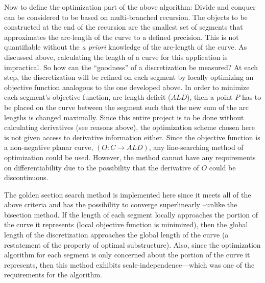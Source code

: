 Now to define the optimization part of the above algorithm:  Divide and 
conquer can be considered to be based on multi-branched recursion.  The 
objects to be constructed at the end of the recursion are the smallest set 
of segments that approximates the arc-length of the curve to a defined 
precision.  This is not quantifiable without the {\it{a priori}} knowledge 
of the arc-length of the curve.  As discussed above, calculating the 
length of a curve for this application is impractical.  So how can the 
``goodness'' of a discretization be measured?  At each step, the 
discretization will be refined on each segment by locally optimizing an 
objective function analogous to the one developed above.  In order to 
minimize each segment’s objective function, arc length deficit ($ALD$), 
then a point $P$ has to be placed on the curve between the segment such 
that the new sum of the arc lengths is changed maximally.  Since this 
entire project is to be done without calculating derivatives (see reasons 
above), the optimization scheme chosen here is not given access to 
derivative information either.  Since the objective function is a 
non-negative planar curve, $(O: C \rightarrow ALD)$, any line-searching 
method of optimization could be used.  However, the method cannot have any 
requirements on differentiability due to the possibility that the 
derivative of $O$ could be discontinuous.

The golden section search method is implemented here since it meets all of 
the above criteria and has the possibility to converge superlinearly 
\cite{brent73}--unlike the bisection method.  If the length of each 
segment locally approaches the portion of the curve it represents (local 
objective function is minimized), then the global length of the 
discretization approaches the global length of the curve (a restatement of 
the property of optimal substructure).  Also, since the optimization 
algorithm for each segment is only concerned about the portion of the 
curve it represents, then this method exhibits scale-independence—which 
was one of the requirements for the algorithm.

